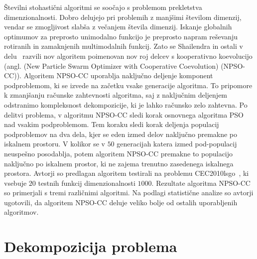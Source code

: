 Številni stohastični algoritmi se soočajo s problemom prekletstva dimenzionalnosti.
Dobro delujejo pri problemih z manjšimi številom dimenzij, vendar se zmogljivost slabša z večanjem števila dimenzij.
Iskanje globalnih optimumov za preprosto unimodalno funkcijo je preprosto napram reševanju rotiranih in zamaknjenih multimodalnih funkcij.
Zato se Shailendra in ostali v delu~\cite{alg:npscc} razvili nov algoritem poimenovan nov roj delcev s kooperativno koevolucijo (angl. (New Particle Swarm Optimizer with Cooperative Coevolution) (NPSO-CC)).
Algoritem NPSO-CC uporablja naključno deljenje komponent podproblemom, ki se izvede na začetku vsake generacije algoritma.
To pripomore k zmanjšanju računske zahtevnosti algoritma, saj z naključnim deljenjem odstranimo kompleksnost dekompozicije, ki je lahko računsko zelo zahtevna.
Po delitvi problema, v algoritmu NPSO-CC sledi korak osnovnega algoritma PSO nad vsakim podproblemom.
Tem koraku sledi korak deljenja populacij podproblemov na dva dela, kjer se eden izmed delov naključno premakne po iskalnem prostoru.
V kolikor se v $50$ generacijah katera izmed pod-populacij neuspešno posodablja, potem algoritem NPSO-CC premakne to populacijo naključno po iskalnem prostor, ki ne zajema trenutno zasedenega iskalnega prostora.
Avtorji so predlagan algoritem testirali na problemu CEC2010lsgo~\cite{bech:cec2010lsgo}, ki vsebuje $20$ testnih funkcij dimenzionalnosti $1000$.
Rezultate algoritma NPSO-CC so primerjali s tremi različnimi algoritmi.
Na podlagi statistične analize so avtorji ugotovili, da algoritem NPSO-CC deluje veliko bolje od ostalih uporabljenih algoritmov.

\section{Dekompozicija problema}

